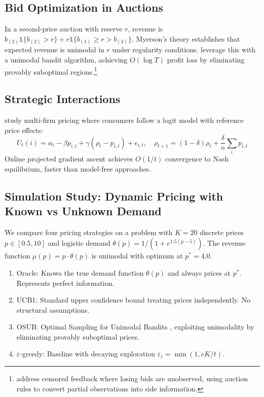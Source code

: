 \subsection{Bid Optimization in Auctions}

In a second-price auction with reserve $r$, revenue is $b_{(2)}\mathbb{1}\{b_{(2)} > r\} + r\mathbb{1}\{b_{(1)} \geq r > b_{(2)}\}$. Myerson's theory establishes that expected revenue is unimodal in $r$ under regularity conditions. \citet{CesaBianchi2015} leverage this with a unimodal bandit algorithm, achieving $O(\log T)$ profit loss by eliminating provably suboptimal regions.\footnote{\citet{Akcay2022} address censored feedback where losing bids are unobserved, using auction rules to convert partial observations into side information.}

\subsection{Strategic Interactions}

\citet{Guo2023} study multi-firm pricing where consumers follow a logit model with reference price effects:
\begin{equation}
U_t(i) = \alpha_i - \beta p_{i,t} + \gamma(\rho_t - p_{i,t}) + \epsilon_{i,t}, \quad \rho_{t+1} = (1-\delta)\rho_t + \frac{\delta}{n}\sum_i p_{i,t}
\end{equation}
Online projected gradient ascent achieves $O(1/t)$ convergence to Nash equilibrium, faster than model-free approaches.

\subsection{Simulation Study: Dynamic Pricing with Known vs Unknown Demand}

We compare four pricing strategies on a problem with $K = 20$ discrete prices $p \in [0.5, 10]$ and logistic demand $\theta(p) = 1/(1 + e^{1.5(p-5)})$. The revenue function $\mu(p) = p \cdot \theta(p)$ is unimodal with optimum at $p^* = 4.0$.

\begin{enumerate}
\item Oracle: Knows the true demand function $\theta(p)$ and always prices at $p^*$. Represents perfect information.
\item UCB1: Standard upper confidence bound treating prices independently. No structural assumptions.
\item OSUB: Optimal Sampling for Unimodal Bandits \citep{CombesProutiere2014}, exploiting unimodality by eliminating provably suboptimal prices.
\item $\varepsilon$-greedy: Baseline with decaying exploration $\varepsilon_t = \min(1, cK/t)$.
\end{enumerate}

